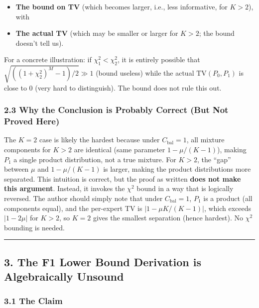 \documentclass[
  12pt,
]{ctexart}
\providecommand{\tightlist}{%
  \setlength{\itemsep}{0pt}\setlength{\parskip}{0pt}}
\begin{document}
\begin{itemize}
\tightlist
\item
  \textbf{The bound on TV} (which becomes larger, i.e., less
  informative, for \(K>2\)), with
\item
  \textbf{The actual TV} (which may be smaller or larger for \(K>2\);
  the bound doesn't tell us).
\end{itemize}

For a concrete illustration: if \(\chi^2_1 < \chi^2_2\), it is entirely
possible that \(\sqrt{((1+\chi^2_2)^M - 1)/2} \gg 1\) (bound useless)
while the actual \(\text{TV}(P_0, P_1)\) is close to 0 (very hard to
distinguish). The bound does not rule this out.

\subsubsection{2.3 Why the Conclusion is Probably Correct (But Not
Proved
Here)}\label{why-the-conclusion-is-probably-correct-but-not-proved-here}

The \(K=2\) case is likely the hardest because under
\(C_{\text{bal}}=1\), all mixture components for \(K>2\) are identical
(same parameter \(1-\mu/(K-1)\)), making \(P_1\) a single product
distribution, not a true mixture. For \(K>2\), the ``gap'' between
\(\mu\) and \(1-\mu/(K-1)\) is larger, making the product distributions
more separated. This intuition is correct, but the proof as written
\textbf{does not make this argument}. Instead, it invokes the \(\chi^2\)
bound in a way that is logically reversed. The author should simply note
that under \(C_{\text{bal}}=1\), \(P_1\) is a product (all components
equal), and the per-expert TV is \(|1 - \mu K/(K-1)|\), which exceeds
\(|1-2\mu|\) for \(K>2\), so \(K=2\) gives the smallest separation
(hence hardest). No \(\chi^2\) bounding is needed.

\begin{center}\rule{0.5\linewidth}{0.5pt}\end{center}

\subsection{3. The F1 Lower Bound Derivation is Algebraically
Unsound}\label{the-f1-lower-bound-derivation-is-algebraically-unsound}

\subsubsection{3.1 The Claim}\label{the-claim}
\end{document}
